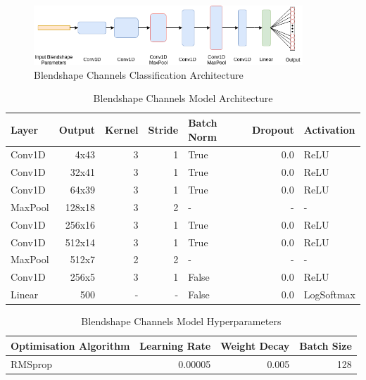 \begin{figure}[h!]
    \centering
        \includegraphics[width=0.9\textwidth]{figures/classification/blendshape_channel_arch.png}
    \caption{Blendshape Channels Classification Architecture}
\end{figure} \label{fig:Blendshape_Channel_Classifier}
\quad

\begin{table}[h!]
\centering
    \begin{tabular}{ l | r | r | r | l | r | l}
    \textbf{Layer} & \textbf{Output} & \textbf{Kernel} & \textbf{Stride} & \textbf{Batch Norm} & \textbf{Dropout} & \textbf{Activation} \\ \hline
    Conv1D & 4x43 & 3 & 1 & True & 0.0 & ReLU \\ \hline
    Conv1D & 32x41 & 3 & 1 & True & 0.0 & ReLU \\ \hline
    Conv1D & 64x39 & 3 & 1 & True & 0.0 & ReLU \\ \hline
    MaxPool & 128x18 & 3 & 2 & - & - & - \\ \hline
    Conv1D & 256x16 & 3 & 1 & True & 0.0 & ReLU \\ \hline
    Conv1D & 512x14 & 3 & 1 & True & 0.0 & ReLU \\ \hline
    MaxPool & 512x7 & 2 & 2 & - & - & - \\ \hline
    Conv1D & 256x5 & 3 & 1 & False & 0.0 & ReLU \\ \hline
    Linear & 500 & - & - & False & 0.0 & LogSoftmax \\
    \end{tabular} 
    \caption{Blendshape Channels Model Architecture}
\end{table}\label{table:blendshape_channels_classifier}
\quad

\begin{table}[h!]
\centering
    \begin{tabular}{l | r | r | r}
    \textbf{Optimisation Algorithm} & \textbf{Learning Rate} & \textbf{Weight Decay} & \textbf{Batch Size} \\
    \hline
    RMSprop & 0.00005 & 0.005 & 128 \\
    \end{tabular} 
    \caption{Blendshape Channels Model Hyperparameters}
\end{table}\label{table:blendshape_channels_classifier_hyperparameters}

